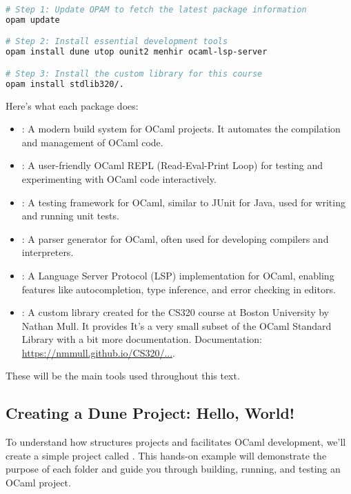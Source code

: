 \begin{lstlisting}[language=Bash, caption={Updating OPAM and Installing Packages}]
# Step 1: Update OPAM to fetch the latest package information
opam update

# Step 2: Install essential development tools
opam install dune utop ounit2 menhir ocaml-lsp-server

# Step 3: Install the custom library for this course
opam install stdlib320/.
\end{lstlisting}

\noindent
Here's what each package does:
\begin{itemize}
	\item {}: A modern build system for OCaml projects. It automates the compilation and management of OCaml code.
	\item {}: A user-friendly OCaml REPL (Read-Eval-Print Loop) for testing and experimenting with OCaml code interactively.
	\item {}: A testing framework for OCaml, similar to JUnit for Java, used for writing and running unit tests.
	\item {}: A parser generator for OCaml, often used for developing compilers and interpreters.
	\item {}: A Language Server Protocol (LSP) implementation for OCaml, enabling features like autocompletion, type inference, and error checking in editors.
	\item {}: A custom library created for the CS320 course at Boston University by Nathan Mull. It provides
	      It's a very small subset of the OCaml Standard Library with a bit more documentation. Documentation: \href{https://nmmull.github.io/CS320/landing/Spring-2025/Specifications/Stdlib320/index.html}{https://nmmull.github.io/CS320/...}.
\end{itemize}

\noindent
These will be the main tools used throughout this text.

\subsection{Creating a Dune Project: Hello, World!}

To understand how  structures projects and facilitates OCaml development, we'll create a simple project called . This hands-on example will demonstrate the purpose of each folder and guide you through building, running, and testing an OCaml project.

